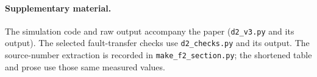 \paragraph{Supplementary material.} The simulation code and raw output
accompany the paper (\texttt{d2\_v3.py} and its output).
The selected fault-transfer checks use \texttt{d2\_checks.py} and its
output. The source-number extraction is recorded in
\texttt{make\_f2\_section.py}; the shortened table and prose use those
same measured values.

